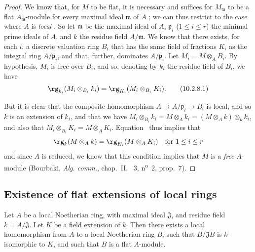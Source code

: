 \begin{proof}
We know that, for $M$ to be flat, it is necessary and suffices for $M_\mathfrak{m}$ to be a flat $A_\mathfrak{m}$-module for every maximal ideal $\mathfrak{m}$ of $A$ ;
we can thus restrict to the case where $A$ is \emph{local} .
So let $\mathfrak{m}$ be the maximal ideal of $A$, $\mathfrak{p}_i$ ($1\leq i\leq r$) the minimal prime ideals of $A$, and $k$ the residue field $A/\mathfrak{m}$.
We know  that there exists, for each $i$, a discrete valuation ring $B_i$ that has the same field of fractions $K_i$ as the integral ring $A/\mathfrak{p}_i$, and that, further, dominates $A/\mathfrak{p}_i$.
Let $M_i=M\otimes_A B_i$.
By hypothesis, $M_i$ is free over $B_i$, and so, denoting by $k_i$ the residue field of $B_i$, we have
\[
\label{0.10.2.8.1}
  \rg_{k_i}(M_i\otimes_{B_i}k_i)=\rg_{K_i}(M_i\otimes_{B_i}K_i).
  \tag{10.2.8.1}
\]

But it is clear that the composite homomorphism $A\to A/\mathfrak{p}_i\to B_i$ is local, and so $k$ is an extension of $k_i$, and that we have $M_i\otimes_{B_i}k_i = M\otimes_A k_i = (M\otimes_A k)\otimes_k k_i$, and also that $M_i\otimes_{B_i}K_i = M\otimes_A K_i$.
Equation~ thus implies that
\[
  \rg_k(M\otimes_A k)=\rg_{K_i}(M\otimes_A K_i)\quad\mbox{for $1\leq i\leq r$}
\]
and since $A$ is reduced, we know that this condition implies that $M$ is a \emph{free} $A$-module (Bourbaki, \emph{Alg. comm.}, chap.~II, \textsection~3, n\textsuperscript{o}~2, prop.~7).
\end{proof}

\subsection{Existence of flat extensions of local rings}
\label{subsection:0.10.3}

\begin{proposition}[10.3.1]
\label{0.10.3.1}
Let $A$ be a local Noetherian ring, with maximal ideal $\mathfrak{J}$, and residue field $k=A/\mathfrak{J}$.
Let $K$ be a field extension of $k$.
Then there exists a local homomorphism from $A$ to a local Noetherian ring $B$, such that $B/\mathfrak{J}B$ is $k$-isomorphic to $K$, and such that $B$ is a flat $A$-module.
\end{proposition}


